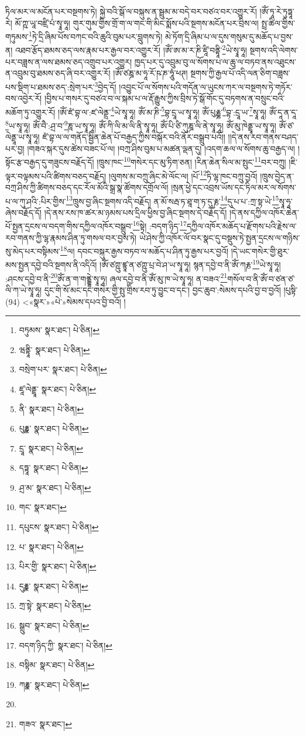 ཏིལ་མར་ལ་མངོན་པར་བསྔགས་ཏེ། སྐྱེ་བའི་སྒོ་ལ་བསྐུས་ན་སྦྲུམ་མ་བདེ་བར་བཙའ་བར་འགྱུར་རོ། །ཨོཾ་ཏཱ་རེ་ཏུཏྟཱ་རེ། མོ་ཀྵ་ཡཱ་བཛྲི་པཾ་སྭཱ་ཧཱ། གུར་གུམ་གྱིས་གྲོ་ག་ལ་གང་གི་མིང་སྨོས་པའི་སྔགས་མངོན་པར་བྲིས་ལ། སྤྲ་ཚིལ་གྱིས་གཏུམས་\footnote{བཏུམས་  སྣར་ཐང་།  པེ་ཅིན། }ཏེ་དྲི་ཞིམ་པོས་བཀང་བའི་ཆུའི་བུམ་པར་བླུགས་ཏེ། མེ་ཏོག་དྲི་ཞིམ་པ་ལ་དུས་གསུམ་དུ་མཆོད་པ་བྱས་ན། འཐབ་རྩོད་ཐམས་ཅད་ལས་རྣམ་པར་རྒྱལ་བར་འགྱུར་རོ། །ཨོཾ་ཨ་མ་ར་ཎི་ཛཱི་བནྟཱི་\footnote{ཝནྟཱི་  སྣར་ཐང་།  པེ་ཅིན། }ཡེ་སྭཱ་ཧཱ། སྔགས་འདི་ལེགས་པར་བཟླས་ན་ལས་ཐམས་ཅད་འགྲུབ་པར་འགྱུར། ཁྱད་པར་དུ་འབྲུམ་བུ་ལ་སོགས་པ་ལ་ཆུ་ལ་བཏབ་ནས་འཐུངས་ན་འབྲུམ་བུ་ཐམས་ཅད་ཞི་བར་འགྱུར་རོ། །ཨོཾ་ཙཎྜ་མ་ཧཱ་རོ་ཥ་ཎ་ཧཱུཾ་ཕཊ། སྔགས་ཀྱི་རྒྱལ་པོ་འདི་ལན་ཅིག་བཟླས་པས་སྡིག་པ་ཐམས་ཅད་:སྲེག་པར་\footnote{བསྲེག་པར་  སྣར་ཐང་།  པེ་ཅིན། }བྱེད་དོ། །འབྱུང་པོ་ལ་སོགས་པའི་གདོན་ལ་ཡུངས་ཀར་ལ་བསྔགས་ཏེ་གཏོར་བས་འབྱེར་རོ། །བྱིས་པ་གསར་དུ་བཙའ་བ་ལ་སྐམ་པ་ལ་རྡོ་རྒྱུས་ཀྱིས་བྲིས་ཏེ་སྒོ་གོང་དུ་བཏགས་ན་བསྲུང་བའི་མཆོག་ཏུ་འགྱུར་རོ། །ཨོཾ་ཛཾ་བྷ་ལ་:ཛ་ལེནྡྲ་\footnote{ཛཱ་ལེནྡྲཱ་  སྣར་ཐང་།  པེ་ཅིན། }ཡེ་སྭཱ་ཧཱ། ཨོཾ་མ་ཎི་\footnote{ནི་  སྣར་ཐང་།  པེ་ཅིན། }བྷ་དྲཱ་ཡ་སྭཱ་ཧཱ། ཨོཾ་པུརྞྞ་\footnote{པུརྞྣ་  སྣར་ཐང་།  པེ་ཅིན། }བྷ་:དྲཱ་ཡ་\footnote{དྲཱ་  སྣར་ཐང་།  པེ་ཅིན། }སྭཱ་ཧཱ། ཨོཾ་དཱ་ན་དཱ་\footnote{དཏྟཱ་  སྣར་ཐང་།  པེ་ཅིན། }ཡ་སྭཱ་ཧཱ། ཨོཾ་བཻ་:ཤྲ་བ་\footnote{ཤྲ་མ་  སྣར་ཐང་།  པེ་ཅིན། }ཎཱ་ཡ་སྭཱ་ཧཱ། ཨོཾ་ཀི་ལི་མ་ལི་ནི་སྭཱ་ཧཱ། ཨོཾ་པི་ཙི་ཀུཎྜ་ལི་ནེ་སྭཱ་ཧཱ། ཨོཾ་མུ་ཁེནྡྲཱ་ཡ་སྭཱ་ཧཱ། ཨོཾ་ཙ་ལེནྡཱ་ཡ་སྭཱ་ཧཱ། ཛཾ་བྷ་ལ་ལ་གནོད་སྦྱིན་ཆེན་པོ་བརྒྱད་ཀྱིས་བསྐོར་བའི་ནོར་བསྒྲུབ་པའོ།། །།དེ་ནས་རབ་གནས་བཤད་པར་བྱ། །གཟའ་སྐར་དུས་ཚེས་བཟང་པོ་ལ། །བཀྲ་ཤིས་བུམ་པ་མཚན་ལྡན་དུ། །འདག་ཆལ་ལ་སོགས་ཆུ་བརྒྱད་ལ། །སྟོང་རྩ་བརྒྱད་དུ་གཟུངས་བརྗོད་དོ། །ཁྲུས་ཁང་\footnote{གང་  སྣར་ཐང་། }གསེར་དང་མུ་ཏིག་ཅན། །རིན་ཆེན་སིལ་མ་སྤུང་\footnote{དཔུངས་  སྣར་ཐང་།  པེ་ཅིན། }བར་བཀྲུ། །ཇི་ལྟར་བལྟམས་པའི་ཚིགས་བཅད་བརྗོད། །ལུགས་མ་བཀྲུ་ཞིང་མེ་ལོང་ལ། །པོ་\footnote{པ་  སྣར་ཐང་།  པེ་ཅིན། }ཏི་ལྷ་ཁང་བཀྲུ་བྱའོ། །ཁྲུས་བྱེད་ན་བཀྲ་ཤིས་ཀྱི་ཚིགས་བཅད་དང་རོལ་མོའི་སྒྲ་སྣ་ཚོགས་དགྲོལ་ལོ། །སྲན་ཕྱེ་དང་འབྲས་ཡོས་དང་ཏིལ་མར་ལ་སོགས་པ་ལ་ཀུ་ཤའི་:པིར་གྱིས་\footnote{པིར་གྱི་  སྣར་ཐང་།  པེ་ཅིན། }ཁྲུས་བྱ་ཞིང་སྔགས་འདི་བརྗོད། ན་མོ་སརྦ་ཏ་ཐཱ་ག་ཏ་དུ་རྞ་\footnote{དུརྞྣ་  སྣར་ཐང་།  པེ་ཅིན། }དུ་པ་པ་:ཀྲ་སྟ་ཡེ་\footnote{ཀྲ་སྟེ་  སྣར་ཐང་།  པེ་ཅིན། }སྭཱ་ཧཱ་ཞེས་བརྗོད་དོ། །དེ་ནས་རས་ཁ་ཚར་མ་ཉམས་པས་དྲིལ་ཕྱིས་བྱ་ཞིང་སྔགས་དེ་བརྗོད་དོ། །དེ་ནས་དཀྱིལ་འཁོར་ཆེན་པོ་སྤྱན་དྲངས་ལ་བདག་གིས་དཀྱིལ་འཁོར་བསྒྲུབ་\footnote{སྒྲུབ་  སྣར་ཐང་།  པེ་ཅིན། }སྟེ། :བདག་ཉིད་\footnote{བདག་ཉིད་ཀྱི་  སྣར་ཐང་།  པེ་ཅིན། }དཀྱིལ་འཁོར་མཆོད་པ་རྫོགས་པའི་རྗེས་ལ་རབ་གནས་ཀྱི་ལྷ་རྣམས་ཤིན་ཏུ་གསལ་བར་བྱས་ཏེ། ཡེ་ཤེས་ཀྱི་འཁོར་ལོ་བར་སྣང་དུ་བསྡུས་ཏེ་སྤྱན་དྲངས་ལ་གཉིས་སུ་མེད་པར་བསྟིམས་\footnote{བསྟིམ་  སྣར་ཐང་།  པེ་ཅིན། }ལ། དབང་བསྐུར་རྒྱས་བཏབ་ལ་མཆོད་པ་ཤིན་ཏུ་རྒྱས་པར་བྱའོ། །དེ་ཡང་གསེར་གྱི་ཐུར་མས་སྤྱན་དབྱེ་བའི་སྔགས་ནི་འདིའོ། །ཨོཾ་ཙཀྵུ་ཛྙཱ་ན་ཙཀྵུ་པྲ་བེ་ཤ་ཡ་སྭཱ་ཧཱ། སྙན་དབྱེ་བ་ནི་ཨོཾ་ཀརྞ་\footnote{ཀརྞྣ་  སྣར་ཐང་།  པེ་ཅིན། }ཡེ་སྭཱ་ཧཱ། :ཤངས་དབྱེ་བ་ནི་\footnote{}ཨོཾ་ན་ག་གནྡྷེ་སྭཱ་ཧཱ། ཞལ་དབྱེ་བ་ནི་ཨོཾ་མུ་ཁ་ཡེ་སྭཱ་ཧཱ། ན་བཟའ་\footnote{གཟའ་  སྣར་ཐང་། }གསོལ་བ་ནི་ཨོཾ་བ་ཙན་ཙ་ལི་ཀ་ཡེ་སྭཱ་ཧཱ། དུང་གི་སོ་མང་དང་གསེར་གྱི་སྤུ་གྲིས་རབ་ཏུ་བྱུང་བ་དང་། བྱང་ཆུབ་:སེམས་དཔའི་བྱ་བ་བྱའོ། །པུསྟི་(94) <«སྣར་»«པེ་»སེམས་དཔའ་བྱི་བའོ། །
